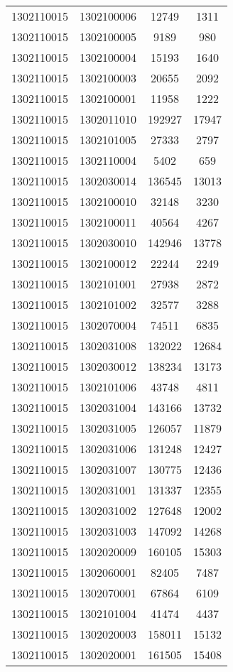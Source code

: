 \begin{longtable}[h]{llcc}
		1302110015 & 1302100006 & 12749 & 1311\\
		1302110015 & 1302100005 & 9189 & 980\\
		1302110015 & 1302100004 & 15193 & 1640\\
		1302110015 & 1302100003 & 20655 & 2092\\
		1302110015 & 1302100001 & 11958 & 1222\\
		1302110015 & 1302011010 & 192927 & 17947\\
		1302110015 & 1302101005 & 27333 & 2797\\
		1302110015 & 1302110004 & 5402 & 659\\
		1302110015 & 1302030014 & 136545 & 13013\\
		1302110015 & 1302100010 & 32148 & 3230\\
		1302110015 & 1302100011 & 40564 & 4267\\
		1302110015 & 1302030010 & 142946 & 13778\\
		1302110015 & 1302100012 & 22244 & 2249\\
		1302110015 & 1302101001 & 27938 & 2872\\
		1302110015 & 1302101002 & 32577 & 3288\\
		1302110015 & 1302070004 & 74511 & 6835\\
		1302110015 & 1302031008 & 132022 & 12684\\
		1302110015 & 1302030012 & 138234 & 13173\\
		1302110015 & 1302101006 & 43748 & 4811\\
		1302110015 & 1302031004 & 143166 & 13732\\
		1302110015 & 1302031005 & 126057 & 11879\\
		1302110015 & 1302031006 & 131248 & 12427\\
		1302110015 & 1302031007 & 130775 & 12436\\
		1302110015 & 1302031001 & 131337 & 12355\\
		1302110015 & 1302031002 & 127648 & 12002\\
		1302110015 & 1302031003 & 147092 & 14268\\
		1302110015 & 1302020009 & 160105 & 15303\\
		1302110015 & 1302060001 & 82405 & 7487\\
		1302110015 & 1302070001 & 67864 & 6109\\
		1302110015 & 1302101004 & 41474 & 4437\\
		1302110015 & 1302020003 & 158011 & 15132\\
		1302110015 & 1302020001 & 161505 & 15408\\

\end{longtable}

